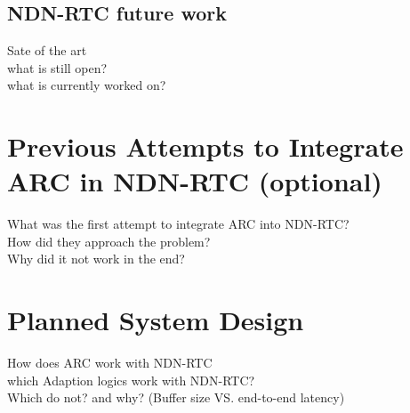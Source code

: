 \subsection{NDN-RTC future work}
Sate of the art \\
what is still open? \\
what is currently worked on?

\section{Previous Attempts to Integrate ARC in NDN-RTC (optional)}
What was the first attempt to integrate ARC into NDN-RTC? \\
How did they approach the problem? \\
Why did it not work in the end? \\

\section{Planned System Design}
How does ARC work with NDN-RTC \\
which Adaption logics work with NDN-RTC? \\
Which do not? and why? (Buffer size VS. end-to-end latency)
